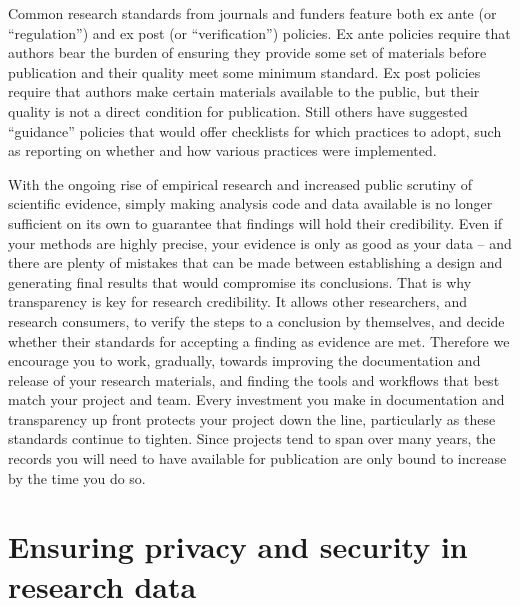Common research standards from journals and funders feature both ex ante
(or ``regulation'') and ex post (or ``verification'') policies.\cite{stodden2013toward}
Ex ante policies require that authors bear the burden
of ensuring they provide some set of materials before publication
and their quality meet some minimum standard.
Ex post policies require that authors make certain materials available to the public,
but their quality is not a direct condition for publication.
Still others have suggested ``guidance'' policies that would offer checklists
for which practices to adopt, such as reporting on whether and how
various practices were implemented.\cite{nosek2015promoting}

With the ongoing rise of empirical research and increased public scrutiny of scientific evidence,
simply making analysis code and data available
is no longer sufficient on its own to guarantee that findings will hold their credibility.
Even if your methods are highly precise,
your evidence is only as good as your data --
and there are plenty of mistakes that can be made between
establishing a design and generating final results that would compromise its conclusions.
That is why transparency is key for research credibility.
It allows other researchers, and research consumers,
to verify the steps to a conclusion by themselves,
and decide whether their standards for accepting a finding as evidence are met.
Therefore we encourage you to work, gradually, towards improving
the documentation and release of your research materials,
and finding the tools and workflows that best match your project and team.
Every investment you make in documentation and transparency up front
protects your project down the line, particularly as these standards continue to tighten.
Since projects tend to span over many years,
the records you will need to have available for publication are
only bound to increase by the time you do so.



\section{Ensuring privacy and security in research data}

